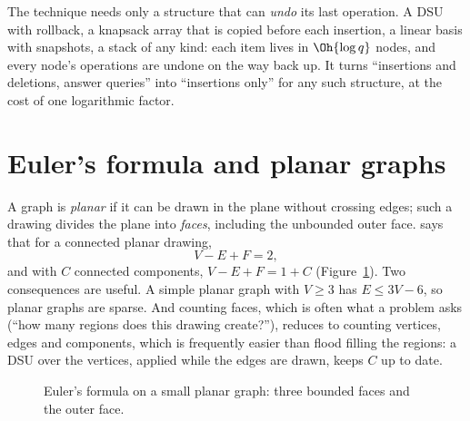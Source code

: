 
\begin{trick}
The technique needs only a structure that can \emph{undo} its last operation. A DSU with rollback, a knapsack array that is
copied before each insertion, a linear basis with snapshots, a stack of any kind: each item lives in $\Oh{\log q}$ nodes, and every
node's operations are undone on the way back up. It turns ``insertions and deletions, answer queries'' into ``insertions only''
for any such structure, at the cost of one logarithmic factor.
\end{trick}

\section[Euler's formula and planar graphs]{Euler's formula and planar graphs \hfill \ioi}\label{sec:planar}

A graph is \emph{planar} if it can be drawn in the plane without crossing edges; such a drawing divides the plane into
\emph{faces}, including the unbounded outer face.  says that for a connected planar drawing,
\[
  V - E + F = 2 ,
\]
and with $C$ connected components, $V - E + F = 1 + C$ (Figure~\ref{fig:euler-formula}). Two consequences are useful. A simple
planar graph with $V \ge 3$ has $E \le 3V - 6$, so planar graphs are sparse. And counting faces, which is often what a problem
asks (``how many regions does this drawing create?''), reduces to counting vertices, edges and components, which is frequently
easier than flood filling the regions: a DSU over the vertices, applied while the edges are drawn, keeps $C$ up to date.

\begin{figure}[htbp]
\centering
{}
\caption{Euler's formula on a small planar graph: three bounded faces and the outer face.}
\label{fig:euler-formula}
\end{figure}

